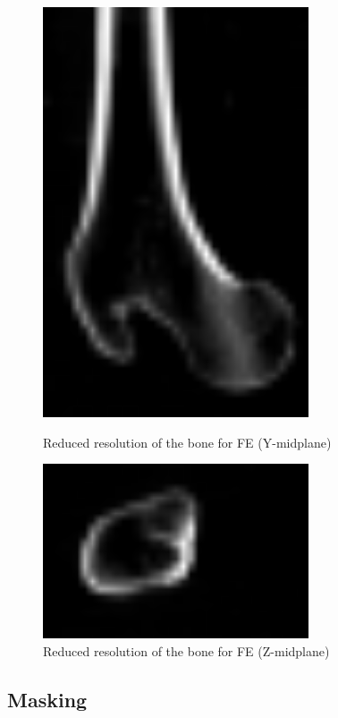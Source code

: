 \documentclass[a4paper,12pt]{article}
\begin{document}
\begin{figure}[htbp]
\begin{minipage}[b]{0.3\textwidth}
            \includegraphics[width=0.7\textwidth]{bone_low_res-YM}
            \caption{Reduced resolution of the bone for FE (Y-midplane)}
            \label{fig:bone_low_res-YM}
        \end{minipage}
        \hfill
        \begin{minipage}[b]{0.3\textwidth}
            \includegraphics[width=0.7\textwidth]{bone_low_res-ZM}
            \caption{Reduced resolution of the bone for FE (Z-midplane)}
            \label{fig:bone_low_res-ZM}
        \end{minipage}
    \end{figure}

    \subsection{Masking}\label{subsec:masking}
\end{document}
